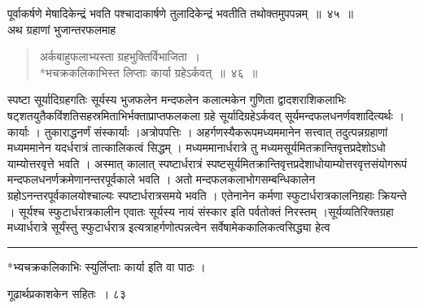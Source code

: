 \documentclass[11pt, openany]{book}
\begin{document}
\begin{sloppypar}
\noindent पूर्वाकर्षणे मेषादिकेन्द्रं भवति पश्चादाकार्षणे तुलादिकेन्द्रं भवतीति तथोक्तमुपपन्नम्~॥~४५~॥\\
\noindent अथ ग्रहाणां भुजान्तरफलमाह\textendash
\end{sloppypar}
\begin{quote}

{\ssi अर्कबाहुफलाभ्यस्ता ग्रहभुक्तिर्विभाजिता~।\\
*भचक्रकलिकाभिस्त लिप्ताः कार्या ग्रहेऽर्कवत्~॥~४६~॥}
\end{quote}
\begin{sloppypar}
स्पष्टा सूर्यादिग्रहगतिः सूर्यस्य भुजफलेन मन्दफलेन कलात्मकेन गुणिता द्वादशराशिकलाभिः षट्शतयुतैकविंशतिसहस्रमिताभिर्भक्ताप्राप्तफलकला ग्रहे सूर्यादिग्रहेऽर्कवत् सूर्यमन्दफलधनर्णवशादित्यर्थः । कार्याः । तुकाराद्धनर्णं संस्कार्याः ।अत्रोपपत्तिः । अहर्गणस्यैकरूपमध्यममानेन सत्त्वात् तदुत्पन्नग्रहाणां मध्यममानेन यदर्धरात्रं तात्कालिकत्वं सिद्धम् । मध्यममानार्धरात्रे तु मध्यमसूर्यमितक्रान्तिवृत्तप्रदेशोऽधो याम्योत्तरवृत्ते भवति । अस्मात् कालात् स्पष्टार्धरात्रं स्पष्टसूर्यमितक्रान्तिवृत्तप्रदेशाधोयाम्योत्तरवृत्तसंयोगरूपं मन्दफलधनर्णक्रमेणानन्तरपूर्वकाले भवति । अतो मन्दफलकलाभोगसम्बन्धिकालेन ग्रहोऽनन्तरपूर्वकालयोश्चाल्यः स्पष्टार्धरात्रसमये भवति । एतेनानेन कर्मणा स्फुटार्धरात्रकालनिग्रहाः क्रियन्ते । सूर्यश्च स्फुटार्धरात्रकालीन एवातः सूर्यस्य नायं संस्कार इति पर्वतोक्तं निरस्तम् ।सूर्यव्यतिरिक्तग्रहा मध्यार्धरात्रे सूर्यंस्तु स्फुटार्धरात्र इत्यत्राहर्गणोत्पन्नत्वेन सर्वेषामेककालिकत्वसिद्ध्या हेत्व\textendash
\end{sloppypar}

\noindent \rule{\linewidth}{.5pt}

\begin{center}
*भ्यचक्रकलिकाभिः स्युर्लिप्ताः कार्या इति वा पाठः ।
\end{center}

\newpage

\hspace{3cm}गूढार्थप्रकाशकेन सहितः~। \hfill ८३
\vspace{1cm}
\end{document}
